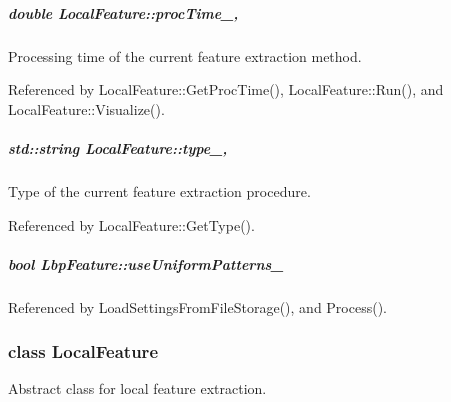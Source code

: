 \hypertarget{group___feature_extractor_a79d60ce90ab8e6ccd66ff8f7da2365c7}{
\subparagraph[{proc\-Time\-\_\-}]{\setlength{\rightskip}{0pt plus 5cm}double Local\-Feature\-::proc\-Time\-\_\-\hspace{0.3cm}{\ttfamily [protected]}, {\ttfamily [inherited]}}}\label{group___feature_extractor_a79d60ce90ab8e6ccd66ff8f7da2365c7}


Processing time of the current feature extraction method. 



Referenced by Local\-Feature\-::\-Get\-Proc\-Time(), Local\-Feature\-::\-Run(), and Local\-Feature\-::\-Visualize().

\hypertarget{group___feature_extractor_aaf3aef30088cd1be80e1770d0a9d945b}{
\subparagraph[{type\-\_\-}]{\setlength{\rightskip}{0pt plus 5cm}std\-::string Local\-Feature\-::type\-\_\-\hspace{0.3cm}{\ttfamily [protected]}, {\ttfamily [inherited]}}}\label{group___feature_extractor_aaf3aef30088cd1be80e1770d0a9d945b}


Type of the current feature extraction procedure. 



Referenced by Local\-Feature\-::\-Get\-Type().

\hypertarget{group___feature_extractor_a6025f411377d4b6e56aa9eb5daff07e8}{
\subparagraph[{use\-Uniform\-Patterns\-\_\-}]{\setlength{\rightskip}{0pt plus 5cm}bool Lbp\-Feature\-::use\-Uniform\-Patterns\-\_\-\hspace{0.3cm}{\ttfamily [private]}}}\label{group___feature_extractor_a6025f411377d4b6e56aa9eb5daff07e8}


Referenced by Load\-Settings\-From\-File\-Storage(), and Process().

\label{class_local_feature}
\hypertarget{group___feature_extractor_class_local_feature}{}
\subsubsection{class Local\-Feature}
Abstract class for local feature extraction. 

